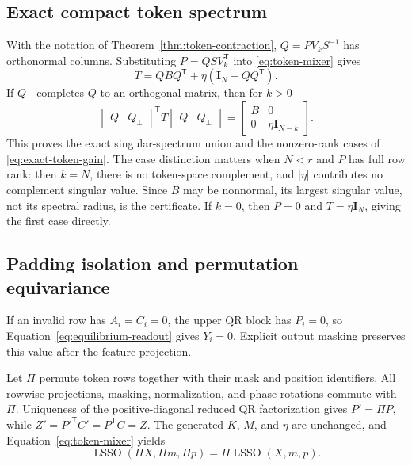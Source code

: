 \documentclass[10pt]{article}
\newcommand{\I}{\mathbf{I}}
\newcommand{\T}{\mathsf{T}}
\begin{document}
\subsection{Exact compact token spectrum}

With the notation of Theorem~\ref{thm:token-contraction}, $Q=PV_kS^{-1}$ has
orthonormal columns.  Substituting $P=QSV_k^\T$ into
\eqref{eq:token-mixer} gives
\begin{equation}
    T=QBQ^\T+\eta(\I_N-QQ^\T).
\label{eq:exact-token-block}
\end{equation}
If
$Q_\perp$ completes $Q$ to an orthogonal matrix, then for $k>0$
\begin{equation}
 \begin{bmatrix}Q&Q_\perp\end{bmatrix}^{\!\T}
 T
 \begin{bmatrix}Q&Q_\perp\end{bmatrix}
 =\begin{bmatrix}B&0\\0&\eta\I_{N-k}\end{bmatrix}.
\end{equation}
This proves the exact singular-spectrum union and the nonzero-rank cases of
\eqref{eq:exact-token-gain}.  The case distinction matters when $N<r$ and
$P$ has full row rank: then $k=N$, there is no token-space complement, and
$|\eta|$ contributes no complement singular value.  Since $B$
may be nonnormal, its largest singular value, not its spectral radius, is the
certificate.  If $k=0$, then $P=0$ and $T=\eta\I_N$, giving the first case
directly.

\subsection{Padding isolation and permutation equivariance}

If an invalid row has $A_i=C_i=0$, the upper QR block has $P_i=0$, so
Equation~\eqref{eq:equilibrium-readout} gives $Y_i=0$.  Explicit output
masking preserves this value after the feature projection.

Let $\Pi$ permute token rows together with their mask and position identifiers.
All rowwise projections, masking, normalization, and phase rotations commute
with $\Pi$.  Uniqueness of the positive-diagonal reduced QR factorization gives
$P'=\Pi P$, while
$Z'=P'^{\T}C'=P^\T C=Z$.  The generated $K$, $M$, and $\eta$ are unchanged,
and Equation~\eqref{eq:token-mixer} yields
\begin{equation}
    \operatorname{LSSO}(\Pi X,\Pi m,\Pi p)
    =\Pi\operatorname{LSSO}(X,m,p).
\end{equation}
\end{document}
